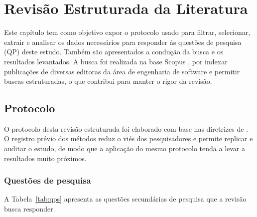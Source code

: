 \chapter[Revisão Estruturada da Literatura]{Revisão Estruturada da Literatura}
\label{cap:revisao}

Este capítulo tem como objetivo expor o protocolo usado para filtrar, selecionar, extrair e analisar os dados necessários para responder às questões de pesquisa (QP) deste estudo. Também são apresentados a condução da busca e os resultados levantados. A busca foi realizada na base Scopus \cite{elsevier2026}, por indexar publicações de diversas editoras da área de engenharia de software e permitir buscas estruturadas, o que contribui para manter o rigor da revisão.

\section{Protocolo}
\label{sec:protocolo}

O protocolo desta revisão estruturada foi elaborado com base nas diretrizes de . O registro prévio dos métodos reduz o viés dos pesquisadores e permite replicar e auditar o estudo, de modo que a aplicação do mesmo protocolo tenda a levar a resultados muito próximos.

\subsection{Questões de pesquisa}
\label{sec:qps}

A Tabela~\ref{tab:qps} apresenta as questões secundárias de pesquisa que a revisão busca responder.

